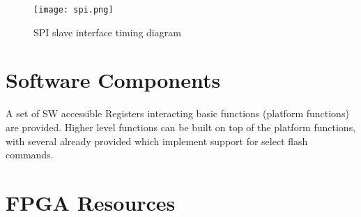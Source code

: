 \documentclass{../../submodules/TEX/document/ug/ug}
\theoremstyle{plain}
\begin{document}
\begin{figure}[H]
  \begin{center}
    \texttt{[image: spi.png]}
    \caption{SPI slave interface timing diagram}
    \label{fig:spi}
  \end{center}
\end{figure}

\section{Software Components}
A set of SW accessible Registers interacting basic functions (platform functions) are provided.
Higher level functions can be built on top of the platform functions, with several already provided
which implement support for select flash commands.

\section*{FPGA Resources}



%
%
\end{document}
